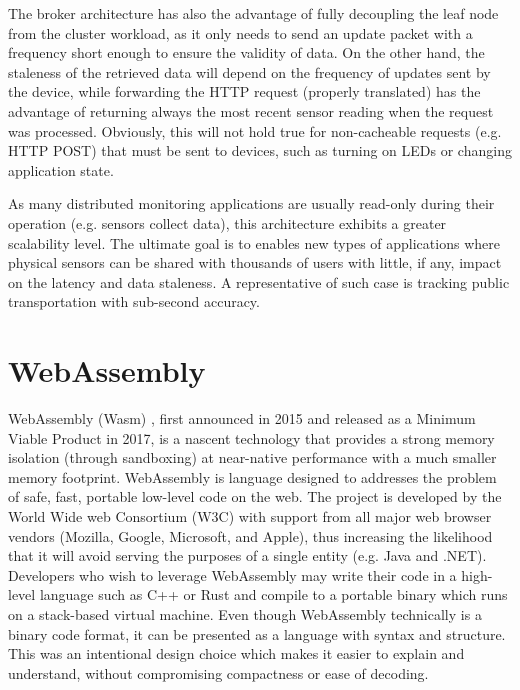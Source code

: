 The broker architecture has also the advantage of fully decoupling the leaf node from the cluster workload, as it only needs to send an update packet with a frequency short enough to ensure the validity of data. On the other hand, the staleness of the retrieved data will depend on the frequency of updates sent by the device, while forwarding the HTTP request (properly translated) has the advantage of returning always the most recent sensor reading when the request was processed. Obviously, this will not hold true for non-cacheable requests (e.g. HTTP POST) that must be sent to devices, such as turning on LEDs or changing application state. 

As many distributed monitoring applications are usually read-only during their operation (e.g. sensors collect data), this architecture exhibits a greater scalability level. The ultimate goal is to enables new types of applications where physical sensors can be shared with thousands of users with little, if any, impact on the latency and data staleness. A representative of such case is tracking public transportation with sub-second accuracy.

\section{WebAssembly}
\label{sec:webassembly}

WebAssembly (Wasm) \cite{wasm}, first announced in 2015 and released as a Minimum Viable Product in 2017, is a nascent technology that provides a strong memory isolation (through sandboxing) at near-native performance with a much smaller memory footprint. WebAssembly is language designed to addresses the problem of safe, fast, portable low-level code on the web. The project is developed by the World Wide web Consortium (W3C) with support from all major web browser vendors (Mozilla, Google, Microsoft, and Apple), thus increasing the likelihood that it will avoid serving the purposes of a single entity (e.g. Java and .NET). Developers who wish to leverage WebAssembly may write their code in a high-level language such as C++ or Rust and compile to a portable binary which runs on a stack-based virtual machine. Even though WebAssembly technically is a binary code format, it can be presented as a language with syntax and structure. This was an intentional design choice which makes it easier to explain and understand, without compromising compactness or ease of decoding.

